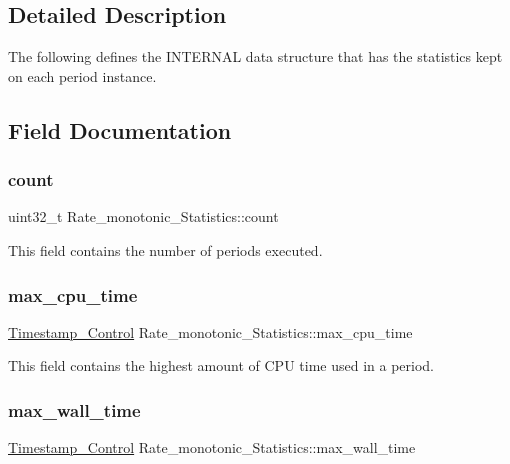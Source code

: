 \subsection{Detailed Description}
The following defines the I\+N\+T\+E\+R\+N\+AL data structure that has the statistics kept on each period instance. 

\subsection{Field Documentation}
\mbox{\label{structRate__monotonic__Statistics_a7d4623fdb41c60413bb4063473f0fc0c}} 
\subsubsection{\texorpdfstring{count}{count}}
{\footnotesize\ttfamily uint32\+\_\+t Rate\+\_\+monotonic\+\_\+\+Statistics\+::count}

This field contains the number of periods executed. \mbox{\label{structRate__monotonic__Statistics_a4b047a93ec678358536a11dd17052368}} 
\subsubsection{\texorpdfstring{max\_cpu\_time}{max\_cpu\_time}}
{\footnotesize\ttfamily \mbox{\hyperlink{group__SuperCoreTimeStamp_ga8508036506d5211c98844c88045e2410}{Timestamp\+\_\+\+Control}} Rate\+\_\+monotonic\+\_\+\+Statistics\+::max\+\_\+cpu\+\_\+time}

This field contains the highest amount of C\+PU time used in a period. \mbox{\label{structRate__monotonic__Statistics_ad3b1b97d97a5279a02d98b23dd829f90}} 
\subsubsection{\texorpdfstring{max\_wall\_time}{max\_wall\_time}}
{\footnotesize\ttfamily \mbox{\hyperlink{group__SuperCoreTimeStamp_ga8508036506d5211c98844c88045e2410}{Timestamp\+\_\+\+Control}} Rate\+\_\+monotonic\+\_\+\+Statistics\+::max\+\_\+wall\+\_\+time}

